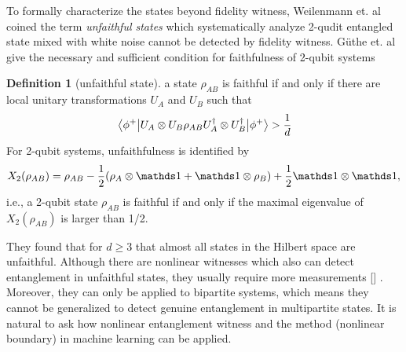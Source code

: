 \documentclass[
reprint,
aps,
pra,
floatfix,
]{revtex4-2}
\theoremstyle{plain}
\theoremstyle{definition}
\newtheorem{definition}{Definition}
\newcommand{\dm}{\rho}
\newcommand{\U}{U}
\begin{document}
To formally characterize the states beyond fidelity witness, Weilenmann et. al \cite{weilenmannEntanglementDetectionMeasuring2020} coined the term \emph{unfaithful states} 
which systematically analyze 2-qudit entangled state mixed with white noise cannot be detected by fidelity witness.
G\"{u}the et. al \cite{guhneGeometryFaithfulEntanglement2021} give the necessary and sufficient condition for faithfulness of 2-qubit systems
\begin{definition}[unfaithful state]\label{def:unfaithful_state}
	a state $\dm_{AB}$ is faithful if and only if there are local unitary transformations $\U_A$ and $\U_B$ such that
	\begin{equation}
		\expval{\U_A\otimes\U_B \dm_{AB} \U_A^\dagger \otimes\U_B^\dagger}{\phi^+}
		> \frac{1}{d}
	\end{equation}
	For 2-qubit systems, unfaithfulness is identified by
	\begin{equation}
		X_2( \dm_{AB})=\rho_{AB}-\frac{1}{2}(\dm_{A}\otimes \identity + \identity \otimes \dm_{B})+\frac{1}{2} \identity \otimes \identity
		\label{eq:unfaithful_2qubit},
	\end{equation}
	i.e.,
	a 2-qubit state $\dm_{AB}$ is faithful if and only if the maximal eigenvalue of $X_2( \dm_{AB})$ is larger than 1/2.
\end{definition}
They found that for $d \ge 3$ that almost all states in the Hilbert space are unfaithful. 
Although there are nonlinear witnesses which also can detect entanglement in unfaithful states, they usually require more measurements []  \cite{zhanDetectingEntanglementUnfaithful2021}.
\cite{riccardiExploringRelationshipFaithfulness2021}
\cite{huOptimizedDetectionHighDimensional2021}
Moreover, they can only be applied to bipartite systems, which means they cannot be generalized to detect genuine entanglement in multipartite states.
It is natural to ask how nonlinear entanglement witness \cite{guhneNonlinearEntanglementWitnesses2006}  and the  method (nonlinear boundary) in machine learning can be applied. 
\end{document}

